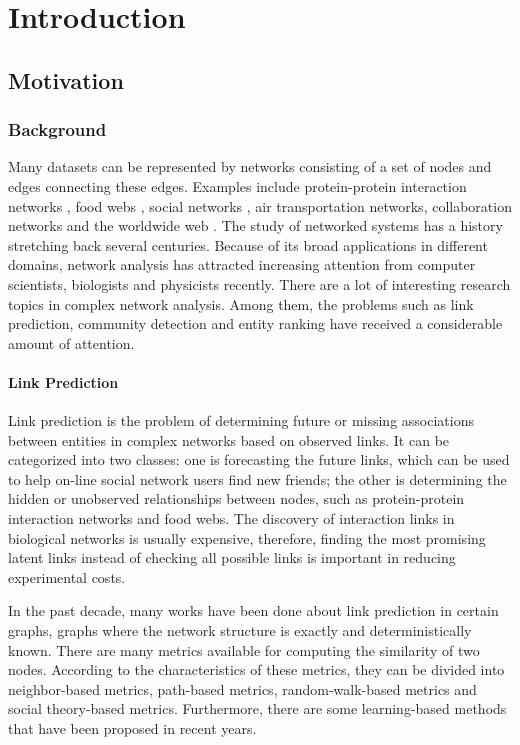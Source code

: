 \documentclass[\main/thesis.tex]{subfiles}
\begin{document}
\chapter{Introduction}

\section{Motivation}
\subsection{Background}
Many datasets can be represented by networks consisting of a set of nodes and edges connecting these edges. Examples include protein-protein interaction networks \cite{krogan2006global}, food webs \cite{williams2000simple}, social networks \cite{shetty2004enron}, air transportation networks, collaboration networks \cite{nascimento2003analysis,leskovec2007graph} and the worldwide web \cite{albert1999internet,broder2000graph}. The study of networked systems has a history stretching back several centuries. Because of its broad applications in different domains, network analysis has attracted increasing attention from computer scientists, biologists and physicists recently. There are a lot of interesting research topics in complex network analysis. Among them, the problems such as link prediction, community detection and entity ranking have received a considerable amount of attention.

\subsubsection{Link Prediction}
Link prediction is the problem of determining future or missing associations between entities in complex networks based on observed links. It can be categorized into two classes: one is forecasting the future links, which can be used to help on-line social network users find new friends; the other is determining the hidden or unobserved relationships between nodes, such as protein-protein interaction networks and food webs. The discovery of interaction links in biological networks is usually expensive, therefore, finding the most promising latent links instead of checking all possible links is important in reducing experimental costs.

In the past decade, many works have been done about link prediction in certain graphs, graphs where the network structure is exactly and deterministically known. There are many metrics available for computing the similarity of two nodes. According to the characteristics of these metrics, they can be divided into neighbor-based metrics, path-based metrics, random-walk-based metrics and social theory-based metrics. Furthermore, there are some learning-based methods that have been proposed in recent years.
\end{document}
